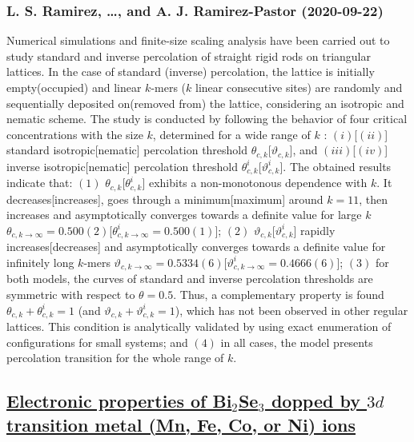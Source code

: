 {\subsubsection*{L. S. Ramirez, \dots, and A. J. Ramirez-Pastor (2020-09-22)}
Numerical simulations and finite-size scaling analysis have been carried out
to study standard and inverse percolation of straight rigid rods on triangular
lattices. In the case of standard (inverse) percolation, the lattice is
initially empty(occupied) and linear $k$-mers ($k$ linear consecutive sites)
are randomly and sequentially deposited on(removed from) the lattice,
considering an isotropic and nematic scheme. The study is conducted by
following the behavior of four critical concentrations with the size $k$,
determined for a wide range of $k$ : $(i)$[$(ii)$] standard isotropic[nematic]
percolation threshold $\theta_{c,k}$[$\vartheta_{c,k}$], and $(iii)$[$(iv)$]
inverse isotropic[nematic] percolation threshold
$\theta^i_{c,k}$[$\vartheta^i_{c,k}$]. The obtained results indicate that:
$(1)$ $\theta_{c,k}$[$\theta^i_{c,k}$] exhibits a non-monotonous dependence
with $k$. It decreases[increases], goes through a minimum[maximum] around $k =
11$, then increases and asymptotically converges towards a definite value for
large $k$ $\theta_{c,k \rightarrow \infty}=0.500(2)$[$\theta^i_{c,k \rightarrow
\infty}=0.500(1)$]; $(2)$ $\vartheta_{c,k}$[$\vartheta^i_{c,k}$] rapidly
increases[decreases] and asymptotically converges towards a definite value for
infinitely long $k$-mers $\vartheta_{c,k \rightarrow
\infty}=0.5334(6)$[$\vartheta^i_{c,k \rightarrow \infty}=0.4666(6)$]; $(3)$ for
both models, the curves of standard and inverse percolation thresholds are
symmetric with respect to $\theta = 0.5$. Thus, a complementary property is
found $\theta_{c,k} + \theta^i_{c,k} = 1$ (and $\vartheta_{c,k} +
\vartheta^i_{c,k} = 1$), which has not been observed in other regular lattices.
This condition is analytically validated by using exact enumeration of
configurations for small systems; and $(4)$ in all cases, the model presents
percolation transition for the whole range of $k$.

\subsection*{\href{http://arxiv.org/abs/2009.10227v1}{Electronic properties of Bi$_{2}$Se$_{3}$ dopped by $3d$ transition  metal (Mn, Fe, Co, or Ni) ions}}
}

